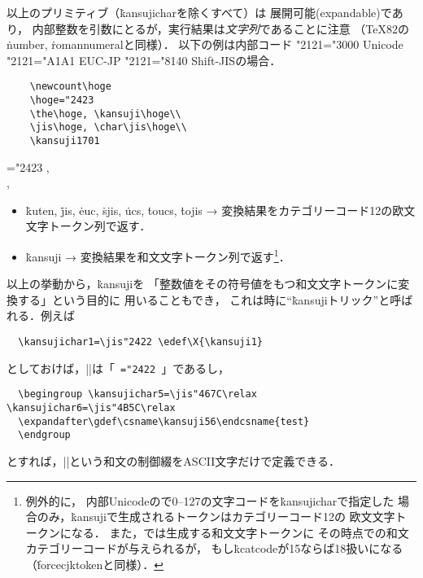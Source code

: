\documentclass[a4paper,11pt,nomag,dvipdfmx]{jsarticle}
\begin{document}
\begin{dangerous}
  以上のプリミティブ（\.{kansujichar}を除くすべて）は
  展開可能(expandable)であり，
  内部整数を引数にとるが，実行結果は\emph{文字列}であることに注意
  （\TeX82の\.{number}, \.{romannumeral}と同様）．
  以下の例は内部コード
  \ifnum\jis"2121="3000 Unicode\else
  \ifnum\jis"2121="A1A1 EUC-JP\else
  \ifnum\jis"2121="8140 Shift-JIS\else{}\fi\fi\fi の場合．

\medskip\noindent
\begin{minipage}{.6\linewidth}
\begin{verbatim}
    \newcount\hoge
    \hoge="2423
    \the\hoge, \kansuji\hoge\\
    \jis\hoge, \char\jis\hoge\\
    \kansuji1701
\end{verbatim}
\end{minipage}
\begin{minipage}{.3\linewidth}
    \newcount\hoge
    \hoge="2423
    \the\hoge, \kansuji\hoge\\
    \jis\hoge, \char\jis\hoge\\
\end{minipage}\medskip

\begin{itemize}
 \item \.{kuten}, \.{jis}, \.{euc}, \.{sjis}, \.{ucs}, \.{toucs}, \.{tojis}
   → 変換結果をカテゴリーコード12の欧文文字トークン列で返す．
 \item \.{kansuji}
   → 変換結果を和文文字トークン列で返す\footnote{例外的に，
   内部Unicodeの\upTeX で0--127の文字コードを\.{kansujichar}で指定した
   場合のみ，\.{kansuji}で生成されるトークンはカテゴリーコード12の
   欧文文字トークンになる\cite{tjb36}．
   また，\upTeX では生成する和文文字トークンに
   その時点での和文カテゴリーコードが与えられるが，
   もし\.{kcatcode}が15ならば18扱いになる（\.{forcecjktoken}と同様）．}．
\end{itemize}

  \medskip
  以上の挙動から，\.{kansuji}を
  「整数値をその符号値をもつ和文文字トークンに変換する」という目的に
  用いることもでき，
  これは時に“\.{kansuji}トリック”と呼ばれる．例えば
\begin{verbatim}
  \kansujichar1=\jis"2422 \edef\X{\kansuji1}
\end{verbatim}
  としておけば，|\expandafter\meaning\X|は「\texttt{%
  =\jis"2422 \edef\X{}%
  \expandafter\meaning\X}」であるし，
\begin{verbatim}
  \begingroup \kansujichar5=\jis"467C\relax \kansujichar6=\jis"4B5C\relax
  \expandafter\gdef\csname\kansuji56\endcsname{test}
  \endgroup
\end{verbatim}
  とすれば，||という和文の制御綴をASCII文字だけで定義できる．
\end{dangerous}
\end{document}
